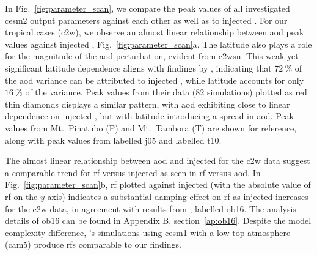 \documentclass{ametsocV6.1}
\newcommand{\iso}[1][i]{{#1}njected \ce{SO2}}
\begin{document}
In Fig.~\ref{fig:parameter_scan}, we compare the peak values of all investigated
\gls{cesm2} output parameters against each other as well as to \iso{}.
For our tropical cases (\gls{c2w}), we observe an almost linear relationship between
\gls{aod} peak values against \iso{}, Fig.~\ref{fig:parameter_scan}a. The latitude also
plays a role for the magnitude of the \gls{aod} perturbation, evident from \gls{c2wsn}.
This weak yet significant latitude dependence aligns with findings by
\citet{marshall2019}, indicating that \(\SI{72}{\percent}\) of the \gls{aod} variance
can be attributed to \iso{}, while latitude accounts for only \(\SI{16}{\percent}\) of
the variance. Peak values from their data (82 simulations) plotted as red thin diamonds
displays a similar pattern, with \gls{aod} exhibiting close to linear dependence on
\iso{}, but with latitude introducing a spread in \gls{aod}. Peak values from Mt.\
Pinatubo (P) and Mt.\ Tambora (T) are shown for reference, along with peak values from
\citet{jones2005} labelled \gls{j05} and \citet{timmreck2010} labelled \gls{t10}.

The almost linear relationship between \gls{aod} and \iso{} for the \gls{c2w} data
suggest a comparable trend for \gls{rf} versus \iso{} as seen in \gls{rf} versus
\gls{aod}. In Fig.~\ref{fig:parameter_scan}b, \gls{rf} plotted against \iso{} (with the
absolute value of \gls{rf} on the \(y\)-axis) indicates a substantial damping effect on
\gls{rf} as \iso{} increases for the \gls{c2w} data, in agreement with results from
\citet{ottobliesner2016}, labelled \gls{ob16}. The analysis details of \gls{ob16} can be
found in Appendix B, section~\ref{ap:ob16}. Despite the model complexity difference,
\citet{ottobliesner2016}'s simulations using \gls{cesm1} with a low-top atmosphere
(\gls{cam5}) produce \glspl{rf} comparable to our findings.
\end{document}
